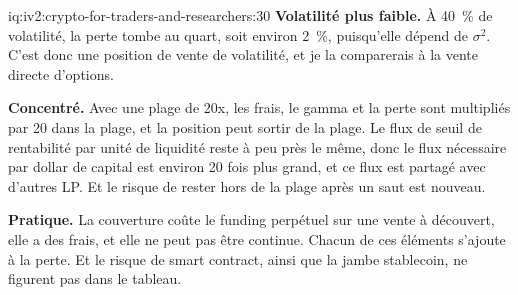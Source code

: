 \begin{solution}{iq:iv2:crypto-for-traders-and-researchers:30}
\textbf{Volatilité plus faible.} À 40~\% de volatilité, la perte tombe au quart, soit environ 2~\%, puisqu'elle dépend de $\sigma^2$. C'est donc une position de vente de volatilité, et je la comparerais à la vente directe d'options.

\textbf{Concentré.} Avec une plage de 20x, les frais, le gamma et la perte sont multipliés par 20 dans la plage, et la position peut sortir de la plage. Le flux de seuil de rentabilité par unité de liquidité reste à peu près le même, donc le flux nécessaire par dollar de capital est environ 20 fois plus grand, et ce flux est partagé avec d'autres LP. Et le risque de rester hors de la plage après un saut est nouveau.

\textbf{Pratique.} La couverture coûte le funding perpétuel sur une vente à découvert, elle a des frais, et elle ne peut pas être continue. Chacun de ces éléments s'ajoute à la perte. Et le risque de smart contract, ainsi que la jambe stablecoin, ne figurent pas dans le tableau.

\end{solution}
